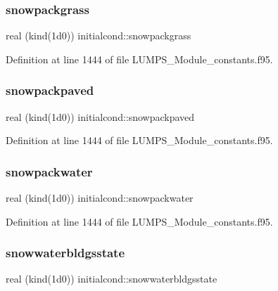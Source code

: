 \subsubsection{\texorpdfstring{snowpackgrass}{snowpackgrass}}
{\footnotesize\ttfamily real (kind(1d0)) initialcond\+::snowpackgrass}



Definition at line 1444 of file L\+U\+M\+P\+S\+\_\+\+Module\+\_\+constants.\+f95.

\mbox{\label{namespaceinitialcond_a032f3141b27c4888091a5d8ce505f6cb}} 
\subsubsection{\texorpdfstring{snowpackpaved}{snowpackpaved}}
{\footnotesize\ttfamily real (kind(1d0)) initialcond\+::snowpackpaved}



Definition at line 1444 of file L\+U\+M\+P\+S\+\_\+\+Module\+\_\+constants.\+f95.

\mbox{\label{namespaceinitialcond_a392484bbee039fe1f1fcf3a3e972254d}} 
\subsubsection{\texorpdfstring{snowpackwater}{snowpackwater}}
{\footnotesize\ttfamily real (kind(1d0)) initialcond\+::snowpackwater}



Definition at line 1444 of file L\+U\+M\+P\+S\+\_\+\+Module\+\_\+constants.\+f95.

\mbox{\label{namespaceinitialcond_afbba2830d10fca6c2e2a8ea93e8c9a38}} 
\subsubsection{\texorpdfstring{snowwaterbldgsstate}{snowwaterbldgsstate}}
{\footnotesize\ttfamily real (kind(1d0)) initialcond\+::snowwaterbldgsstate}



